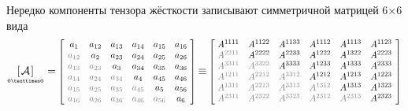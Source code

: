 \begin{otherlanguage}{russian}
\vspace{-0.2em} Нередко компоненты тензора жёсткости записывают симметричной матрицей 6×6 вида
\nopagebreak\vspace{.1em}\[ \displaystyle
\underset{\raisemath{.1em}{\scriptscriptstyle 6×6}}{[\hspace{.2ex}\mathcal{A}\hspace{.2ex}]} \hspace{0.12ex} = \hspace{-0.16ex}
%
\scalebox{0.82}{$\left[\hspace{0.4em} {\begin{matrix}
a_{1} & a_{12} & a_{13} & a_{14} & a_{15} & a_{16} \\
{\color{gray}a_{12}} & a_{2} & a_{23} & a_{24} & a_{25} & a_{26} \\
{\color{gray}a_{13}} & {\color{gray}a_{23}} & a_{3} & a_{34} & a_{35} & a_{36} \\
{\color{gray}a_{14}} & {\color{gray}a_{24}} & {\color{gray}a_{34}} & a_{4} & a_{45} & a_{46} \\
{\color{gray}a_{15}} & {\color{gray}a_{25}} & {\color{gray}a_{35}} & {\color{gray}a_{45}} & a_{5} & a_{56} \\
{\color{gray}a_{16}} & {\color{gray}a_{26}} & {\color{gray}a_{36}} & {\color{gray}a_{46}} & {\color{gray}a_{56}} & a_{6}
\end{matrix}} \hspace{0.32em}\right] $}  \hspace{-0.2ex} \equiv \hspace{-0.2ex}
%
\scalebox{0.82}{$\left[\hspace{0.32em} {\begin{matrix}
A^{1111} & A^{1122} & A^{1133} & A^{1112} & A^{1113} & A^{1123} \\
{\color{gray}A^{2211}} & A^{2222} & A^{2233} & A^{1222} & A^{1322} & A^{2223} \\
{\color{gray}A^{3311}} & {\color{gray}A^{3322}} & A^{3333} & A^{1233} & A^{1333} & A^{2333} \\
{\color{gray}A^{1211}} & {\color{gray}A^{2212}} & {\color{gray}A^{3312}} & A^{1212} & A^{1213} & A^{1223} \\
{\color{gray}A^{1311}} & {\color{gray}A^{2213}} & {\color{gray}A^{3313}} & {\color{gray}A^{1312}} & A^{1313} & A^{1323} \\
{\color{gray}A^{2311}} & {\color{gray}A^{2322}} & {\color{gray}A^{3323}} & {\color{gray}A^{2312}} & {\color{gray}A^{2313}} & A^{2323}
\end{matrix}} \hspace{0.4em}\right] $}
\]


\end{otherlanguage}
